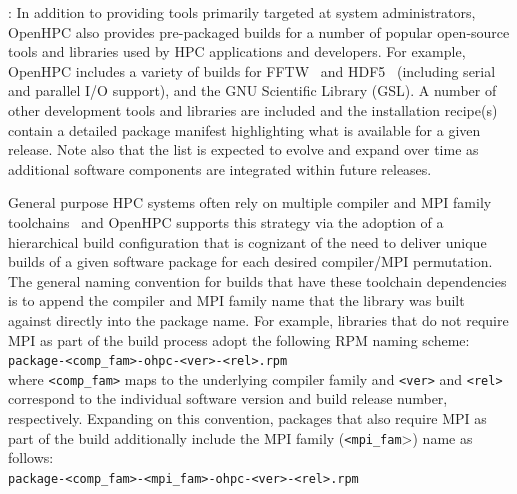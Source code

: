 \documentclass{sig-alternate-05-2015}
\begin{document}
: In addition to providing tools primarily
targeted at system administrators, OpenHPC also provides pre-packaged builds
for a number of popular open-source tools and libraries used by HPC
applications and developers. For example, OpenHPC includes a variety of builds
for FFTW~\cite{FFTW05} and HDF5~\cite{hdf5_url} (including serial and
parallel I/O support), and the GNU Scientific Library (GSL). A number of other
development tools and libraries are included and the installation recipe(s)
contain a detailed package manifest highlighting what is available for a given
release. Note also that the list is expected to evolve
and expand over time as additional software components are integrated within
future releases.

General purpose HPC systems often rely on multiple compiler and MPI family
toolchains~\cite{tacc_sc_best_practices:2011} and OpenHPC supports this
strategy via the adoption of a hierarchical build configuration that is
cognizant of the need to deliver unique builds of a given software package for
each desired compiler/MPI permutation.
The general naming convention for builds that have these toolchain dependencies 
is to append the compiler and MPI family name that the
library was built against directly into the package name. For example,
libraries that do not require MPI as part of the build process adopt the
following RPM naming scheme: \\

\noindent
\texttt{package-<comp\_fam>-ohpc-<ver>-<rel>.rpm} \\

\noindent where \texttt{<comp\_fam>} maps to the underlying compiler family and \texttt{<ver>}
and \texttt{<rel>} correspond to the individual software version and build
release number, respectively.
Expanding on this convention, packages that also require MPI as part of the build 
additionally include the MPI family (\texttt{<mpi\_fam}>) name as follows: \\

\noindent
\texttt{package-<comp\_fam>-<mpi\_fam>-ohpc-<ver>-<rel>.rpm} \\
\end{document}
